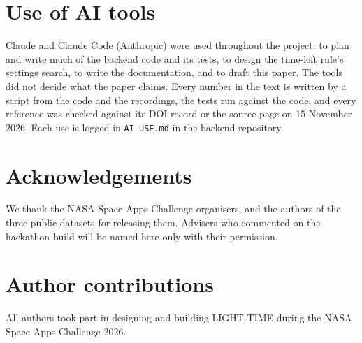 \section*{Use of AI tools}
Claude and Claude Code (Anthropic) were used throughout the project: to plan and write much of the backend code and its tests, to design the time-left rule's settings search, to write the documentation, and to draft this paper. The tools did not decide what the paper claims. Every number in the text is written by a script from the code and the recordings, the tests run against the code, and every reference was checked against its DOI record or the source page on 15 November 2026. Each use is logged in \texttt{AI\_USE.md} in the backend repository.

\section*{Acknowledgements}
We thank the NASA Space Apps Challenge organisers, and the authors of the three public datasets for releasing them. Advisers who commented on the hackathon build will be named here only with their permission.

\section*{Author contributions}
All authors took part in designing and building LIGHT-TIME during the NASA Space Apps Challenge 2026.
